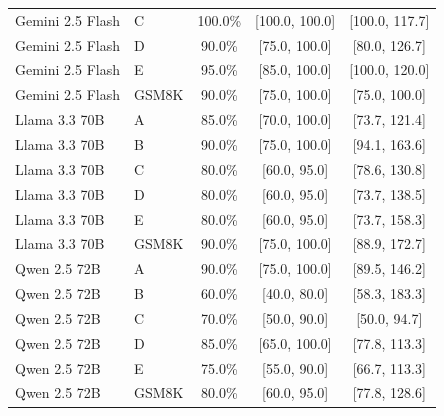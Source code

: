 \begin{table}[htbp]
\begin{tabular}{llccc}
    Gemini 2.5 Flash & C & 100.0\% & [100.0, 100.0] & [100.0, 117.7] \\
    Gemini 2.5 Flash & D & 90.0\% & [75.0, 100.0] & [80.0, 126.7] \\
    Gemini 2.5 Flash & E & 95.0\% & [85.0, 100.0] & [100.0, 120.0] \\
    Gemini 2.5 Flash & GSM8K & 90.0\% & [75.0, 100.0] & [75.0, 100.0] \\
    \addlinespace
    Llama 3.3 70B & A & 85.0\% & [70.0, 100.0] & [73.7, 121.4] \\
    Llama 3.3 70B & B & 90.0\% & [75.0, 100.0] & [94.1, 163.6] \\
    Llama 3.3 70B & C & 80.0\% & [60.0, 95.0] & [78.6, 130.8] \\
    Llama 3.3 70B & D & 80.0\% & [60.0, 95.0] & [73.7, 138.5] \\
    Llama 3.3 70B & E & 80.0\% & [60.0, 95.0] & [73.7, 158.3] \\
    Llama 3.3 70B & GSM8K & 90.0\% & [75.0, 100.0] & [88.9, 172.7] \\
    \addlinespace
    Qwen 2.5 72B & A & 90.0\% & [75.0, 100.0] & [89.5, 146.2] \\
    Qwen 2.5 72B & B & 60.0\% & [40.0, 80.0] & [58.3, 183.3] \\
    Qwen 2.5 72B & C & 70.0\% & [50.0, 90.0] & [50.0, 94.7] \\
    Qwen 2.5 72B & D & 85.0\% & [65.0, 100.0] & [77.8, 113.3] \\
    Qwen 2.5 72B & E & 75.0\% & [55.0, 90.0] & [66.7, 113.3] \\
    Qwen 2.5 72B & GSM8K & 80.0\% & [60.0, 95.0] & [77.8, 128.6] \\
    \bottomrule
  \end{tabular}
\end{table}



